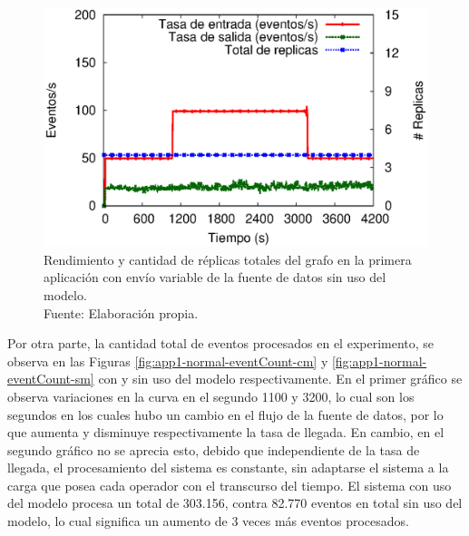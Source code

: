 \begin{figure}[!ht]
	\centering
	\captionsetup{justification=centering}
	\includegraphics[scale=0.7]{images/exp/app1/normal/sm/processSystem.eps}
    \caption[Rendimiento y cantidad de r\'eplicas totales del grafo en la primera aplicaci\'on con env\'io variable de la fuente de datos sin uso del modelo.]{Rendimiento y cantidad de r\'eplicas totales del grafo en la primera aplicaci\'on con env\'io variable de la fuente de datos sin uso del modelo.\\Fuente: Elaboraci\'on propia.}
	\label{fig:app1-normal-processSystem-sm}
\end{figure}

Por otra parte, la cantidad total de eventos procesados en el experimento, se observa en las Figuras \ref{fig:app1-normal-eventCount-cm} y \ref{fig:app1-normal-eventCount-sm} con y sin uso del modelo respectivamente. En el primer gr\'afico se observa variaciones en la curva en el segundo 1100 y 3200, lo cual son los segundos en los cuales hubo un cambio en el flujo de la fuente de datos, por lo que aumenta y disminuye respectivamente la tasa de llegada. En cambio, en el segundo gr\'afico no se aprecia esto, debido que independiente de la tasa de llegada, el procesamiento del sistema es constante, sin adaptarse el sistema a la carga que posea cada operador con el transcurso del tiempo. El sistema con uso del modelo procesa un total de 303.156, contra 82.770 eventos en total sin uso del modelo, lo cual significa un aumento de 3 veces m\'as eventos procesados.

